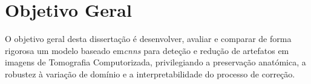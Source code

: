 \section{Objetivo Geral}

O objetivo geral desta dissertação é desenvolver, avaliar e comparar de forma rigorosa um modelo baseado em\textit{\glspl{cnn}} para deteção e redução de artefatos em imagens de Tomografia Computorizada, privilegiando a preservação anatómica, a robustez à variação de domínio e a interpretabilidade do processo de correção.